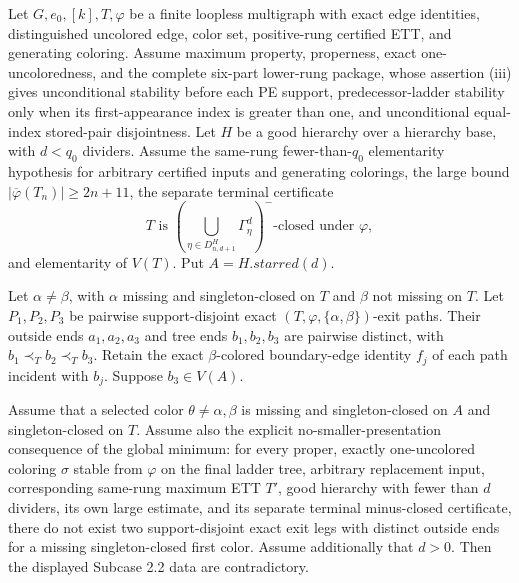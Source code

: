 \begin{lemma}
Let $G,e_0,[k],T,\varphi$ be a finite loopless multigraph with exact edge
identities, distinguished uncolored edge, color set, positive-rung
certified ETT, and generating coloring.  Assume maximum property,
properness, exact one-uncoloredness, and the complete six-part lower-rung
package, whose assertion (iii) gives unconditional stability before each PE
support, predecessor-ladder stability only when its first-appearance index is
greater than one, and unconditional equal-index stored-pair disjointness.  Let $H$ be a good hierarchy over a hierarchy base, with
$d<q_0$ dividers.  Assume the same-rung fewer-than-$q_0$ elementarity
hypothesis for arbitrary certified inputs and generating colorings, the
large bound $|\overline\varphi(T_n)|\geq2n+11$, the separate terminal
certificate
\[
 T\text{ is }
 \left(\bigcup_{\eta\in D^H_{n,d+1}}\Gamma^d_\eta\right)^-
 \text{-closed under }\varphi,
\]
and elementarity of $V(T)$.  Put $A=H.\mathit{starred}(d)$.

Let $\alpha\ne\beta$, with $\alpha$ missing and singleton-closed on $T$
and $\beta$ not missing on $T$.  Let $P_1,P_2,P_3$ be pairwise
support-disjoint exact $(T,\varphi,\{\alpha,\beta\})$-exit paths.  Their
outside ends $a_1,a_2,a_3$ and tree ends $b_1,b_2,b_3$ are pairwise
distinct, with $b_1\prec_T b_2\prec_T b_3$.  Retain the exact
$\beta$-colored boundary-edge identity $f_j$ of each path incident with
$b_j$.  Suppose $b_3\in V(A)$.

Assume that a selected color $\theta\ne\alpha,\beta$ is missing and
singleton-closed on $A$ and singleton-closed on $T$.  Assume also the
explicit no-smaller-presentation consequence of the global minimum: for
every proper, exactly one-uncolored coloring $\sigma$ stable from
$\varphi$ on the final ladder tree, arbitrary replacement input,
corresponding same-rung maximum ETT $T'$, good hierarchy with fewer than
$d$ dividers, its own large estimate, and its separate terminal
minus-closed certificate, there do not exist two support-disjoint exact
exit legs with distinct outside ends for a missing singleton-closed first
color.  Assume additionally that $d>0$.  Then the displayed Subcase 2.2
data are contradictory.
\end{lemma}
